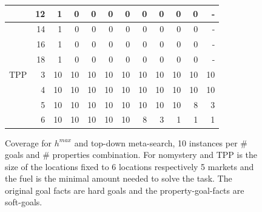 \begin{figure}[ht]
\begin{tabular}{l|r|rrrrrrrrrr}
				& 12 & 1 & 0 & 0 & 0 & 0 & 0 & 0 & 0 & 0 & - \\\hline 
				& 14 & 1 & 0 & 0 & 0 & 0 & 0 & 0 & 0 & 0 & - \\\hline 
				& 16 & 1 & 0 & 0 & 0 & 0 & 0 & 0 & 0 & 0 & - \\\hline 
				& 18 & 1 & 0 & 0 & 0 & 0 & 0 & 0 & 0 & 0 & - \\\hline\hline
		TPP & 3 & 10 & 10 & 10 & 10 & 10 & 10 & 10 & 10 & 10 & 10\\\hline
			& 4 & 10 & 10 & 10 & 10 & 10 & 10 & 10 & 10 & 10 & 10\\\hline
			& 5 & 10 & 10 & 10 & 10 & 10 & 10 & 10 & 10 & 8 & 3\\\hline
			& 6 & 10 & 10 & 10 & 10 & 10 & 8 & 3 & 1 & 1 & 1\\\hline


	\end{tabular}
	\caption{Coverage for $h^{max}$ and top-down meta-search, 10 instances per \# goals and \# properties combination.
	For nomystery and TPP is the size of the locations fixed to 6 locations respectively 5 markets and the fuel is the 
	minimal amount needed to solve the task.
	The original goal facts are hard goals and the property-goal-facts are soft-goals.}
\end{figure}

